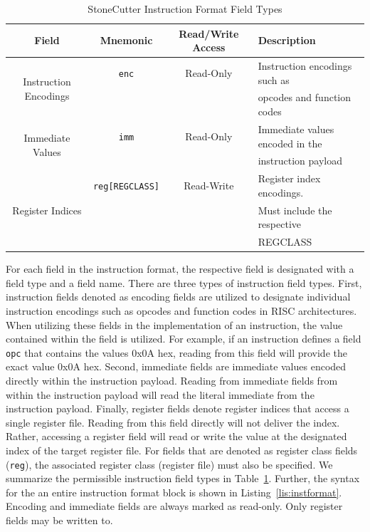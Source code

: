 \documentclass{article}
\begin{document}
\begin{table}[h]
\begin{center}
\caption{StoneCutter Instruction Format Field Types}
\vspace{0.125in}
\label{tab:instformatfields}
\begin{tabular}{|c|c|c|l|}
\hline
\textbf{Field} & \textbf{Mnemonic} & \textbf{Read/Write Access} & \textbf{Description}\\
\hline
\multirow{2}{*}{Instruction Encodings} & \texttt{enc} & Read-Only & Instruction encodings such as\\
												  & & & opcodes and function codes\\
\hline
\multirow{2}{*}{Immediate Values} & \texttt{imm} & Read-Only & Immediate values encoded in the\\
											      & & & instruction payload\\
\hline
\multirow{3}{*}{Register Indices} & \texttt{reg[REGCLASS]} & Read-Write & Register index encodings.\\
														& & & Must include the respective\\
														& & & REGCLASS\\
\hline
\end{tabular}
\end{center}
\end{table}

For each field in the instruction format, the respective field is designated with a field type and a field name.  There are 
three types of instruction field types.  First, instruction fields denoted as encoding fields are utilized to designate 
individual instruction encodings such as opcodes and function codes in RISC architectures.  When utilizing these fields 
in the implementation of an instruction, the value contained within the field is utilized.  For example, if an instruction 
defines a field \texttt{opc} that contains the values 0x0A hex, reading from this field will provide the exact value 0x0A hex.  
Second, immediate fields are immediate values encoded directly within the instruction payload.  Reading from immediate 
fields from within the instruction payload will read the literal immediate from the instruction payload.  Finally, register fields 
denote register indices that access a single register file.  Reading from this field directly will not deliver the index.  Rather, accessing 
a register field will read or write the value at the designated index of the target register file.    
For fields that are denoted as register class fields (\texttt{reg}), the associated register class (register file) must also be specified.  
We summarize the permissible instruction field types in Table~\ref{tab:instformatfields}.  Further, the syntax for the an entire instruction 
format block is shown in Listing~\ref{lis:instformat}.  Encoding and immediate fields are always marked as read-only.  Only 
register fields may be written to.  
\end{document}
